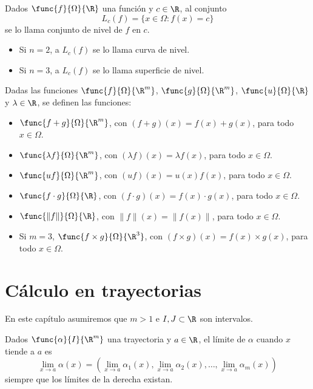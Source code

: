 \documentclass[a4,11pt]{aleph-notas}
\begin{document}
\begin{defi}
    Dados $\func{f}{\Omega}{\R}$ una función y $c\in\R$, al conjunto
    \[
        L_c(f)=\{x\in \Omega:f(x)=c\}
    \]
    se lo llama conjunto de nivel de $f$ en $c$.
\end{defi}

\begin{advertencia}
    \begin{itemize}
        \item Si $n=2$, a $L_c(f)$ se lo llama curva de nivel.
        \item Si $n=3$, a $L_c(f)$ se lo llama superficie de nivel.
    \end{itemize}
\end{advertencia}

\begin{defi}
    Dadas las funciones $\func{f}{\Omega}{\R^m}$, $\func{g}{\Omega}{\R^m}$, $\func{u}{\Omega}{\R}$ y $\lambda\in\R$, se definen las funciones:
    \begin{itemize}
        \item $\func{f+g}{\Omega}{\R^m}$, con $(f+g)(x)=f(x)+g(x)$, para todo $x\in \Omega$.
        \item $\func{\lambda f}{\Omega}{\R^m}$, con $(\lambda f)(x)= \lambda f(x)$, para todo $x\in \Omega$.
        \item $\func{u f}{\Omega}{\R^m}$, con $(u f)(x)= u(x) f(x)$, para todo $x\in \Omega$.
        \item $\func{f\cdot g}{\Omega}{\R}$, con $(f\cdot g)(x)=f(x)\cdot g(x)$, para todo $x\in \Omega$.
        \item $\func{\|f\|}{\Omega}{\R}$, con $\|f\|(x)=\|f(x)\|$, para todo $x\in \Omega$.
        \item Si $m=3$, $\func{f\times g}{\Omega}{\R^3}$, con $(f\times g)(x)= f(x)\times g(x)$, para todo $x\in \Omega$.
    \end{itemize}
\end{defi}

\section{Cálculo en trayectorias}


En este capítulo asumiremos que $m>1$ e $I,J\subset\R$ son intervalos.

\begin{defi}[Límite]
    Dados $\func{\alpha}{I}{\R^m}$ una trayectoria y $a\in\R$, el límite de $\alpha$ cuando $x$ tiende a $a$ es
    \[
        \lim_{x\to a}\alpha(x)
        =\left(\lim_{x\to a}\alpha_1(x),\lim_{x\to a}\alpha_2(x),\ldots,\lim_{x\to a}\alpha_m(x)\right)
    \]
    siempre que los límites de la derecha existan.
\end{defi}
\end{document}
